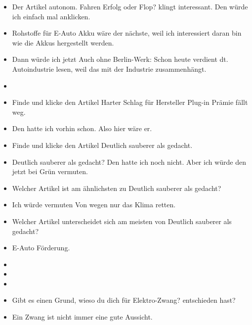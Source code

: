 {\begin{itemize}[]
                  Wenn ich jetzt nämlich schon in dieser Staat-Kategorie bin, dann würde ich da jetzt auch mehr zu lesen wollen.
            \item {} Der Artikel \flqq autonom. Fahren Erfolg oder Flop?\frqq{} klingt interessant.
                  Den würde ich einfach mal anklicken.
            \item {} \flqq Rohstoffe für E-Auto Akku\frqq{} wäre der nächste, weil ich interessiert daran bin wie die Akkus hergestellt werden.
            \item {} Dann würde ich jetzt \flqq Auch ohne Berlin-Werk: Schon heute verdient dt. Autoindustrie\frqq{} lesen, weil das mit der Industrie zusammenhängt.
            \item {}
            \item {} Finde und klicke den Artikel \flqq Harter Schlag für Hersteller Plug-in Prämie fällt weg\frqq{}.
            \item {} Den hatte ich vorhin schon. Also hier wäre er.
            \item {} Finde und klicke den Artikel \flqq Deutlich sauberer als gedacht\frqq{}.
            \item {} \flqq Deutlich sauberer als gedacht\frqq{}?
                  Den hatte ich noch nicht.
                  Aber ich würde den jetzt bei Grün vermuten.
            \item {} Welcher Artikel ist am ähnlichsten zu \flqq Deutlich sauberer als gedacht\frqq{}?
            \item {} Ich würde vermuten \flqq Von wegen nur das Klima retten\frqq{}.
            \item {} Welcher Artikel unterscheidet sich am meisten von \flqq Deutlich sauberer als gedacht\frqq{}?
            \item {} \flqq E-Auto Förderung\frqq{}.
            \item {}
            \item {}
            \item {}
            \item {} Gibt es einen Grund, wieso du dich für \flqq Elektro-Zwang?\frqq{} entschieden hast?
            \item {} Ein Zwang ist nicht immer eine gute Aussicht.

\end{itemize}}
